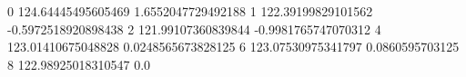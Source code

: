 0 124.64445495605469 1.6552047729492188
1 122.39199829101562 -0.5972518920898438
2 121.99107360839844 -0.9981765747070312
4 123.01410675048828 0.0248565673828125
6 123.07530975341797 0.0860595703125
8 122.98925018310547 0.0
